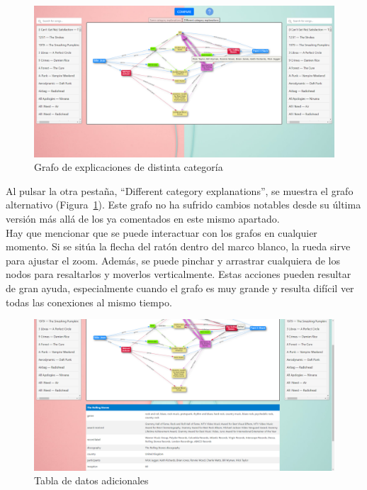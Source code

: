 \begin{figure}[h!]
	\centering
	\includegraphics[width = 1\textwidth]{Imagenes/Bitmap/Pantalla different graph.png}
	\caption{Grafo de explicaciones de distinta categoría}
	\label{fig:distintaCategoria}
\end{figure}

Al pulsar la otra pestaña, ``Different category explanations'', se muestra el grafo alternativo (Figura~\ref{fig:distintaCategoria}). Este grafo no ha sufrido cambios notables desde su última versión más allá de los ya comentados en este mismo apartado.\\

Hay que mencionar que se puede interactuar con los grafos en cualquier momento. Si se sitúa la flecha del ratón dentro del marco blanco, la rueda sirve para ajustar el zoom. Además, se puede pinchar y arrastrar cualquiera de los nodos para resaltarlos y moverlos verticalmente. Estas acciones pueden resultar de gran ayuda, especialmente cuando el grafo es muy grande y resulta difícil ver todas las conexiones al mismo tiempo.\\

\begin{figure}[h!]
	\centering
	\includegraphics[width = 1\textwidth]{Imagenes/Bitmap/Pantalla tabla.png}
	\caption{Tabla de datos adicionales}
	\label{fig:tablaAdicional}
\end{figure}

